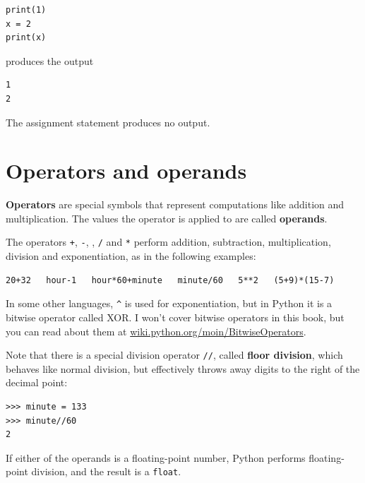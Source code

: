 \documentclass[10pt]{book}
\begin{document}
\beforeverb
\begin{verbatim}
print(1)
x = 2
print(x)
\end{verbatim}
\afterverb
%
produces the output

\beforeverb
\begin{verbatim}
1
2
\end{verbatim}
\afterverb
%
The assignment statement produces no output.


\section{Operators and operands}

{\bf Operators} are special symbols that represent computations like
addition and multiplication.  The values the operator is applied to
are called {\bf operands}.

The operators {\tt +}, {\tt -}, {\tt *}, {\tt /} and {\tt **}
perform addition, subtraction, multiplication, division and
exponentiation, as in the following examples:

\beforeverb
\begin{verbatim}
20+32   hour-1   hour*60+minute   minute/60   5**2   (5+9)*(15-7)
\end{verbatim}
\afterverb
%
In some other languages, \verb"^" is used for exponentiation, but
in Python it is a bitwise operator called XOR.  I won't cover
bitwise operators in this book, but you can read about
them at \url{wiki.python.org/moin/BitwiseOperators}.



Note that there is a special division operator {\tt //}, called {\bf floor division}, which behaves like normal division, but effectively throws away digits to the right of the decimal point:

\beforeverb
\begin{verbatim}
>>> minute = 133
>>> minute//60
2
\end{verbatim}
\afterverb
%


If either of the operands is a floating-point number, Python performs
floating-point division, and the result is a {\tt float}.
\end{document}
